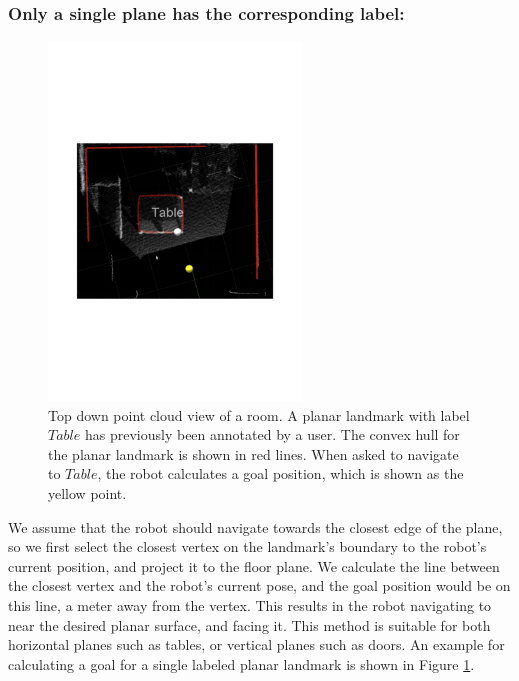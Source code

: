 \subsubsection{Only a single plane has the corresponding label: }
\label{sec:navigation_goal_single_label}

\begin{figure}[ht!]
\centering
\includegraphics[width=0.6\textwidth]{pics/single_plane}
\caption{Top down point cloud view of a room. A planar landmark with label $Table$ has previously been annotated by a user. The convex hull for the planar landmark is shown in red lines. When asked to navigate to $Table$, the robot calculates a goal position, which is shown as the yellow point.}
\label{fig:single_plane}
\end{figure}

We assume that the robot should navigate towards the closest edge of the plane, so we first select the closest vertex on the landmark's boundary to the robot's current position, and project it to the floor plane. We calculate the line between the closest vertex and the robot's current pose, and the goal position would be on this line, a meter away from the vertex. This results in the robot navigating to near the desired planar surface, and facing it. This method is suitable for both horizontal planes such as tables, or vertical planes such as doors. An example for calculating a goal for a single labeled planar landmark is shown in Figure \ref{fig:single_plane}.

